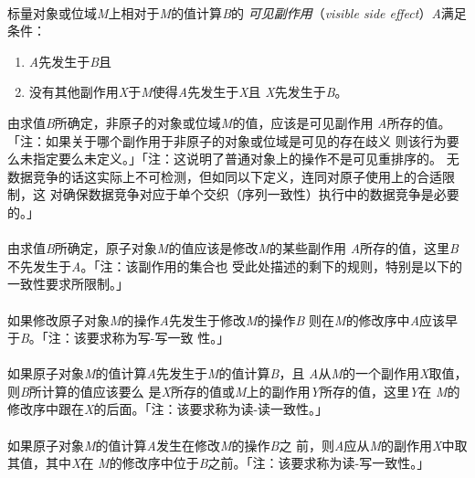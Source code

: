 \paragraph{}
标量对象或位域\textit{M}上相对于\textit{M}的值计算\textit{B}的
\textit{可见副作用}（\textit{visible side effect}）\textit{A}满足条件：
\begin{enumerate}
  \item{\textit{A}先发生于\textit{B}且}
  \item{没有其他副作用\textit{X}于\textit{M}使得\textit{A}先发生于\textit{X}且
    \textit{X}先发生于\textit{B}。}
\end{enumerate}
由求值\textit{B}所确定，非原子的对象或位域\textit{M}的值，应该是可见副作用
\textit{A}所存的值。「注：如果关于哪个副作用于非原子的对象或位域是可见的存在歧义
则该行为要么未指定要么未定义。」「注：这说明了普通对象上的操作不是可见重排序的。
无数据竞争的话这实际上不可检测，但如同以下定义，连同对原子使用上的合适限制，这
对确保数据竞争对应于单个交织（序列一致性）执行中的数据竞争是必要的。」

\paragraph{}
由求值\textit{B}所确定，原子对象\textit{M}的值应该是修改\textit{M}的某些副作用
\textit{A}所存的值，这里\textit{B}不先发生于\textit{A}。「注：该副作用的集合也
受此处描述的剩下的规则，特别是以下的一致性要求所限制。」

\paragraph{}
如果修改原子对象\textit{M}的操作\textit{A}先发生于修改\textit{M}的操作\textit{B}
则在\textit{M}的修改序中\textit{A}应该早于\textit{B}。「注：该要求称为写-写一致
性。」

\paragraph{}
如果原子对象\textit{M}的值计算\textit{A}先发生于\textit{M}的值计算\textit{B}，且
\textit{A}从\textit{M}的一个副作用\textit{X}取值，则\textit{B}所计算的值应该要么
是\textit{X}所存的值或\textit{M}上的副作用\textit{Y}所存的值，这里\textit{Y}在
\textit{M}的修改序中跟在\textit{X}的后面。「注：该要求称为读-读一致性。」

\paragraph{}
如果原子对象\textit{M}的值计算\textit{A}发生在修改\textit{M}的操作\textit{B}之
前，则\textit{A}应从\textit{M}的副作用\textit{X}中取其值，其中\textit{X}在
\textit{M}的修改序中位于\textit{B}之前。「注：该要求称为读-写一致性。」

